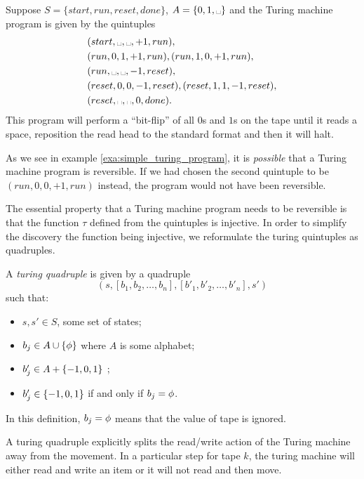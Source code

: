 \begin{example}\label{exa:simple_turing_program}
  Suppose $S=\{start,run,reset,done\}$, $A=\{0,1,\blank\}$ and the Turing machine
  program is given by the quintuples
  \begin{align*}
    &(start,\blank,\blank,+1,run),\\
    &(run,0,1,+1,run), (run,1,0,+1,run),\\
    &(run,\blank,\blank,-1,reset),\\
    &(reset,0,0,-1,reset),(reset,1,1,-1,reset),\\
    &(reset,\blank,\blank,0,done).
  \end{align*}
  This program will perform a ``bit-flip'' of all $0$s and $1$s on the tape
  until it reads a space, reposition the read head to the standard format
  and then it will halt.
\end{example}

As we see in example \vref{exa:simple_turing_program}, it is \emph{possible}
that a Turing machine program is reversible. If we had chosen the second
quintuple to be $(run,0,0,+1,run)$ instead, the program would not have been
reversible.

The essential property that a Turing machine program needs to be reversible
is that the function $\tau$ defined from the quintuples is injective. In order
to simplify the discovery the function being injective, we reformulate the
turing quintuples as quadruples.

\begin{definition}\label{def:turing_quadruple}
  A \emph{turing quadruple} is given by a quadruple
  \[(s,[b_1,b_2,\ldots,b_n],[b'_1,b'_2,\ldots,b'_n],s')\]
  such that:
  \begin{itemize}[{(}i{)}]
    \item $s,s'\in S$, some set of states;
    \item $b_j\in A  \cup \{\phi\}$ where $A$ is some alphabet;
    \item $b'_j\in A  + \{-1,0,1\}$ ;
    \item $b'_j \in \{-1,0,1\}$ if and only if $b_j = \phi$.
  \end{itemize}
  In this definition, $b_j = \phi$ means that the value of tape
  \jay is ignored.
\end{definition}

A turing quadruple explicitly splits the read/write action of the
Turing machine away from the movement. In a particular step for
tape $k$, the
turing machine will either read and write an item or it will not
read and then move.

